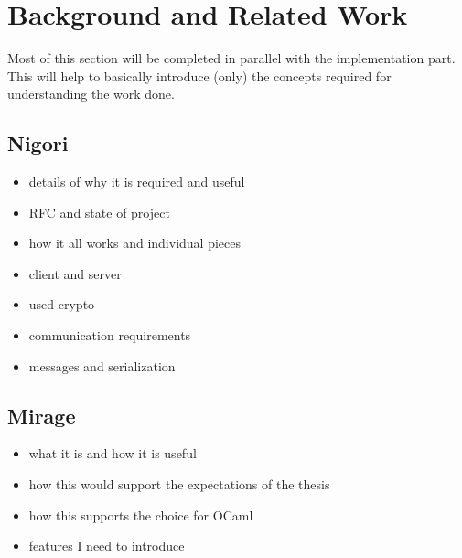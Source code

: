 \chapter{Background and Related Work}

Most of this section will be completed in parallel with the implementation part.
This will help to basically introduce (only) the concepts required for understanding the work done.

\section{Nigori}
\begin{itemize}
  \item details of why it is required and useful
  \item RFC and state of project
  \item how it all works and individual pieces
  \item client and server
  \item used crypto
  \item communication requirements
  \item messages and serialization
\end{itemize}

\section{Mirage}
\begin{itemize}
  \item what it is and how it is useful
  \item how this would support the expectations of the thesis
  \item how this supports the choice for OCaml
  \item features I need to introduce
\end{itemize}
